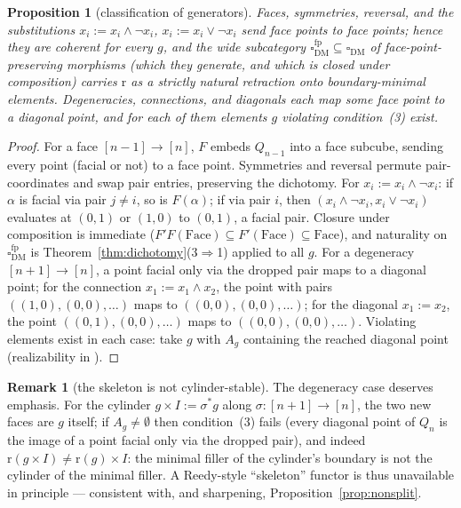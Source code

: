 \documentclass[11pt]{amsart}
\newtheorem{prop}[thm]{Proposition}
\theoremstyle{definition}
\newtheorem{rem}[thm]{Remark}
\newcommand{\cube}{\square_{\mathrm{DM}}}
\newcommand{\cubefp}{\square_{\mathrm{DM}}^{\mathrm{fp}}}
\newcommand{\lc}{Q}
\newcommand{\Face}{\mathrm{Face}}
\newcommand{\rmin}{\mathrm{r}}
\begin{document}
\begin{prop}[classification of generators]
  \label{prop:generators}
  Faces, symmetries, reversal, and the substitutions
  $x_i := x_i \wedge \neg x_i$, $x_i := x_i \vee \neg x_i$ send face
  points to face points; hence they are coherent for \emph{every}
  $g$, and the wide subcategory $\cubefp \subseteq \cube$ of
  face-point-preserving morphisms (which they generate, and which is
  closed under composition) carries $\rmin$ as a strictly natural
  retraction onto boundary-minimal elements.  Degeneracies,
  connections, and diagonals each map some face point to a diagonal
  point, and for each of them elements $g$ violating
  condition~(3) exist.
\end{prop}

\begin{proof}
  For a face $[n-1] \to [n]$, $F$ embeds $\lc_{n-1}$ into a face
  subcube, sending every point (facial or not) to a face point.
  Symmetries and reversal permute pair-coordinates and swap pair
  entries, preserving the dichotomy.  For
  $x_i := x_i \wedge \neg x_i$: if $\alpha$ is facial via pair $j
  \neq i$, so is $F(\alpha)$; if via pair $i$, then
  $(x_i \wedge \neg x_i, x_i \vee \neg x_i)$ evaluates at
  $(0,1)$ or $(1,0)$ to $(0, 1)$, a facial pair.  Closure under
  composition is immediate ($F' F(\Face) \subseteq F'(\Face)
  \subseteq \Face$), and naturality on $\cubefp$ is
  Theorem~\ref{thm:dichotomy}(3$\Rightarrow$1) applied to all $g$.
  For a degeneracy $[n+1] \to [n]$, a point facial only via the
  dropped pair maps to a diagonal point; for the connection
  $x_1 := x_1 \wedge x_2$, the point with pairs
  $((1,0), (0,0), \dots)$ maps to $((0,0), (0,0), \dots)$; for the
  diagonal $x_1 := x_2$, the point $((0,1), (0,0), \dots)$ maps to
  $((0,0), (0,0), \dots)$.  Violating elements exist in each case:
  take $g$ with $A_g$ containing the reached diagonal point
  (realizability in \cite[Thm.~3.4]{DMFibers}).
\end{proof}

\begin{rem}[the skeleton is not cylinder-stable]
  \label{rem:cylinder}
  The degeneracy case deserves emphasis.  For the cylinder
  $g \times I := \sigma^{*} g$ along $\sigma : [n+1] \to [n]$, the
  two new faces are $g$ itself; if $A_g \neq \emptyset$ then
  condition~(3) fails (every diagonal point of $\lc_n$ is the image
  of a point facial only via the dropped pair), and indeed
  $\rmin(g \times I) \neq \rmin(g) \times I$: the minimal filler of
  the cylinder's boundary is not the cylinder of the minimal
  filler.  A Reedy-style ``skeleton'' functor is thus unavailable in
  principle --- consistent with, and sharpening,
  Proposition~\ref{prop:nonsplit}.
\end{rem}
\end{document}

